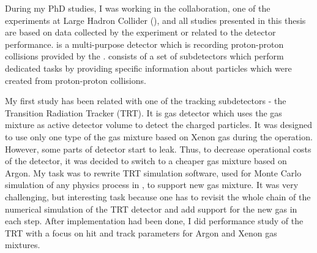 




\begin{preface}

During my PhD studies, I was working in the \ATLAS collaboration, one of the experiments at Large Hadron Collider (\LHC), and all studies presented in this thesis are based on data collected by the \ATLAS experiment or related to the \ATLAS detector performance.
\ATLAS is a multi-purpose detector which is recording proton-proton collisions provided by the \LHC. \ATLAS consists of a set of subdetectors which perform dedicated tasks by providing specific information about particles which were created from proton-proton collisions.

My first study has been related with one of the \ATLAS tracking subdetectors - the Transition Radiation Tracker (TRT).
It is gas detector which uses the gas mixture as active detector volume to detect the charged particles. It was designed to use only one type of the gas mixture based on Xenon gas during the operation. However, some parts of detector start to leak. Thus, to decrease operational costs of the detector, it was decided to switch to a cheaper gas mixture based on Argon. My task was to rewrite TRT simulation software, used for Monte Carlo simulation of any physics process in \ATLAS, to support new gas mixture. It was very challenging, but interesting task because one has to revisit the whole chain of the numerical simulation of the TRT detector and add support for the new gas in each step. After implementation had been done, I did performance study of the TRT with a focus on hit and track parameters for Argon and Xenon gas mixtures.


\end{preface}
